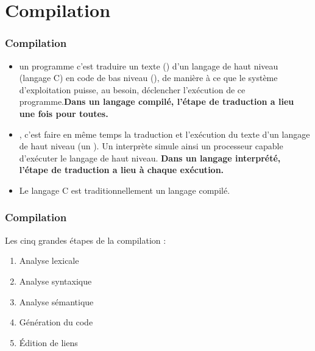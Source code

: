 \documentclass[xcolor=pdftex,svgnames,table]{beamer}
\begin{document}
\frame[label=plan]{\tableofcontents}


\section{Compilation}
\begin{frame}
  \frametitle{Compilation\nowrite}
\begin{itemize} 
\item  {} un programme c'est traduire un texte () d'un langage de haut niveau (langage C) en code de bas
  niveau (), de manière à ce que le système
  d'exploitation puisse, au besoin, déclencher l'exécution de ce
  programme.\pause \textbf{Dans un langage compilé, l'étape de traduction a
    lieu une fois pour toutes.}\pause

\item {}, c'est faire en même temps la traduction et l'exécution du
texte d'un langage de haut niveau (un ). Un interprète simule ainsi un
processeur capable d'exécuter le langage de haut niveau. \pause
\textbf{Dans un
langage interprété, l'étape de traduction a lieu à chaque exécution.}\pause
\item Le langage C est traditionnellement un langage compilé.
\end{itemize}
\end{frame}

\begin{frame}
  \frametitle{Compilation\nowrite}
 
Les cinq grandes étapes de la compilation :

  \begin{enumerate}
  \item Analyse lexicale
  \item Analyse syntaxique
  \item Analyse sémantique
  \item Génération du code
  \item Édition de liens
\end{enumerate}
\end{frame}
\end{document}
